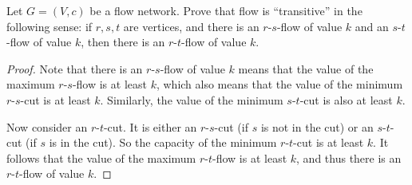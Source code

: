 



    \begin{thm}{}{}
        Let $G = (V, c)$ be a flow network. Prove that flow is ``transitive'' in the following sense: if $r, s, t$ are vertices, and there is an $r$-$s$-flow of value $k$ and an $s$-$t$-flow of value $k$, then there is an $r$-$t$-flow of value $k$.
    \end{thm}

    \begin{proof}
        Note that there is an $r$-$s$-flow of value $k$ means that the value of the maximum $r$-$s$-flow is at least $k$, which also means that the value of the minimum $r$-$s$-cut is at least $k$. Similarly, the value of the minimum $s$-$t$-cut is also at least $k$.
        
        Now consider an $r$-$t$-cut. It is either an $r$-$s$-cut (if $s$ is not in the cut) or an $s$-$t$-cut (if $s$ is in the cut). So the capacity of the minimum $r$-$t$-cut is at least $k$. It follows that the value of the maximum $r$-$t$-flow is at least $k$, and thus there is an $r$-$t$-flow of value $k$.
    \end{proof}




